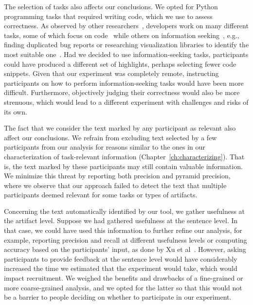 The selection of tasks also affects our conclusions. We opted for Python programming tasks that 
required writing code, which we use to assess correctness. 
As observed by other researchers~\cite{satterfield2020, meyer2020}, developers
work on many different tasks, some of which focus on code~\cite{Meyer2017}
while others on information seeking~\cite{gonccalves2011}, e.g., finding duplicated bug reports or researching visualization libraries to identify the most suitable one~\cite{satterfield2020}.
Had we decided to use information-seeking tasks, participants could have produced a different set of highlights,
perhaps selecting fewer code snippets. 
Given that 
our experiment was completely remote, instructing participants on how to perform information-seeking 
tasks would have been more difficult. Furthermore, objectively judging their correctness 
would also be more strenuous, which would lead to a different experiment with challenges and risks of its own.




The fact that we consider the text marked by any participant as relevant 
also affect our conclusions. 
We refrain from excluding text selected by a few participants from our analysis 
for reasons similar to the ones in our characterization of task-relevant information (Chapter~\ref{ch:characterizing}). That is, the text marked by these participants may still contain valuable information. 
We minimize this threat by reporting both precision and pyramid precision, where we observe that 
our approach failed to detect the text that multiple participants deemed relevant
for some tasks or types of artifacts. 



Concerning the text automatically identified by our tool, we gather usefulness at the artifact level.
Suppose we had gathered usefulness at the sentence level. In that case, we could have used this information 
to further refine our analysis, for example, reporting precision and recall 
at different usefulness levels or computing accuracy based on the participants' input, as done by Xu et al~\cite{Xu2017}. 
However, asking participants to provide feedback at the sentence level would have considerably increased the time we estimated that the experiment would take,
which would impact recruitment. We weighed the benefits and drawbacks of a fine-grained or more coarse-grained 
analysis, and we opted for the latter so that this would not be a barrier to people deciding on 
whether to participate in our experiment.
